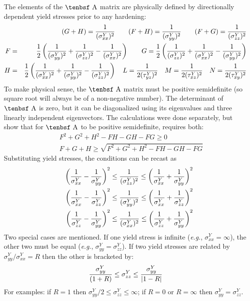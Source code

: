 \documentclass[11pt]{article}
\def\A{\hbox{\tenbsf A}}
\def\s#1{\sigma_{#1}}
\def\t#1{\tau_{#1}}
\begin{document}
The elements of the $\A$ matrix are physically defined by directionally dependent yield stresses prior to any hardening:
\begin{eqnarray}
       &&(G+H)  =  {1\over (\s{xx}^Y)^2}   \qquad
       (F+H)  =  {1\over (\s{yy}^Y)^2}  \qquad
       (F+G)  =  {1\over (\s{zz}^Y)^2} \\
        F & = & {1\over 2}\left( {1\over (\s{yy}^Y)^2} + {1\over (\s{zz}^Y)^2} - {1\over (\s{xx}^Y)^2}\right) \qquad
       G = {1\over 2}\left( {1\over (\s{zz}^Y)^2} + {1\over (\s{xx}^Y)^2} - {1\over (\s{yy}^Y)^2}\right) \\
       H & = & {1\over 2}\left( {1\over (\s{xx}^Y)^2} + {1\over (\s{yy}^Y)^2} - {1\over (\s{zz}^Y)^2}\right) \quad
       L = {1\over 2(\t{yz}^Y)^2} \quad M = {1\over 2(\t{xz}^Y)^2} \quad N = {1\over 2(\t{xy}^Y)^2}
\end{eqnarray}
To make physical sense, the $\A$ matrix must be positive semidefinite (so square root will always be of a non-negative number). The determinant of $\A$ is zero, but it can be diagonalized using its eigenvalues and three linearly independent eigenvectors. The calculations were done separately, but show that for $\A$ to be positive semidefinite, requires both:
\begin{eqnarray}
        &&F^2+G^2+H^2-FH-GH-FG \ge 0 \\
        &&F+G+H \ge \sqrt{F^2+G^2+H^2-FH-GH-FG}
\end{eqnarray}
Substituting yield stresses, the conditions can be recast as
\begin{eqnarray}
    && \left({1\over \s{xx}^Y}- {1\over \s{yy}^Y}\right)^2 \le {1\over (\s{zz}^Y)^2} \le \left({1\over \s{xx}^Y}+ {1\over \s{yy}^Y}\right)^2 \\
    && \left({1\over \s{xx}^Y}- {1\over \s{zz}^Y}\right)^2 \le {1\over (\s{yy}^Y)^2} \le \left({1\over \s{xx}^Y}+ {1\over \s{zz}^Y}\right)^2 \\
    && \left({1\over \s{zz}^Y}- {1\over \s{yy}^Y}\right)^2 \le {1\over (\s{xx}^Y)^2} \le \left({1\over \s{zz}^Y}+ {1\over \s{yy}^Y}\right)^2 
\end{eqnarray}
Two special cases are mentioned. If one yield stress is infinite ({\em e.g.}, $\s{xx}^Y=\infty$), the other two must be equal ({\em e.g.}, $\s{yy}^Y=\s{zz}^Y$).  If two yield stresses are related by $\s{yy}^Y/\s{xx}^Y=R$ then the other is bracketed by:
\begin{equation}
         { \s{yy}^Y \over (1+R)} \le   \s{zz}^Y   \le { \s{yy}^Y \over |1-R|} 
\end{equation}
For examples: if $R=1$ then $ \s{yy}^Y/2 \le \s{zz}^Y \le \infty$; if $R=0$ or $R=\infty$ then $ \s{yy}^Y= \s{zz}^Y$.
\end{document}
